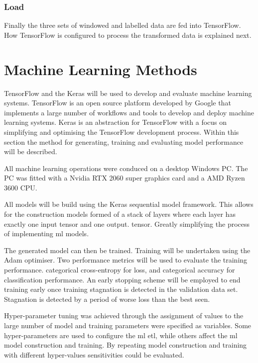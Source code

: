 \subsubsection{Load}
Finally the three sets of windowed and labelled data are fed into TensorFlow. How TensorFlow is configured to process the transformed data is explained next.


\section{Machine Learning Methods}
TensorFlow and the Keras will be used to develop and evaluate machine learning systems. TensorFlow is an open source platform developed by Google that implements a large number of workflows and tools to develop and deploy machine learning systems. %
Keras is an abstraction for TensorFlow with a focus on simplifying and optimising the TensorFlow development process. %
Within this section the method for generating, training and evaluating model performance will be described.

All machine learning operations were conduced on a desktop Windows PC. The PC was fitted with a Nvidia RTX 2060 super graphics card and a AMD Ryzen 3600 CPU.

All models will be build using the Keras sequential model framework. This allows for the construction models formed of a stack of layers where each layer has exactly one input tensor and one output. tensor.%
Greatly simplifying the process of implementing \acrshort{ml} models.

The generated model can then be trained. Training will be undertaken using the Adam optimiser\cite{Kingma2015}. Two performance metrics will be used to evaluate the training performance. categorical cross-entropy for loss, and categorical accuracy for classification performance. An early stopping scheme will be employed to end training early once training stagnation is detected in the validation data set. Stagnation is detected by a period of worse loss than the best seen.

Hyper-parameter tuning was achieved through the assignment of values to the large number of model and training parameters were specified as variables. Some hyper-parameters are used to configure the \acrshort{ml} \acrshort{etl}, while others affect the \acrshort{ml} model construction and training. By repeating model construction and training with different hyper-values sensitivities could be evaluated.

